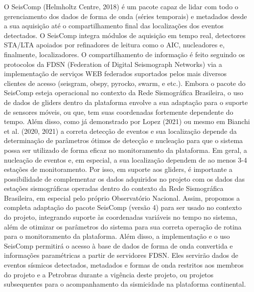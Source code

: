 \documentclass[10pt,a4paper,oneside]{book}
\begin{document}
O SeisComp (Helmholtz Centre, 2018) é um pacote capaz de lidar com todo o gerenciamento dos dados de forma de onda (séries temporais) e metadados desde a sua aquisição até o compartilhamento final das localizações dos eventos detectados. O SeisComp integra módulos de aquisição em tempo real, detectores STA/LTA apoiados por refinadores de leitura como o AIC, nucleadores e, finalmente, localizadores. O compartilhamento de informação é feito seguindo os protocolos da FDSN (Federation of Digital Seismograph Networks) via a implementação de serviços WEB federados suportados pelos mais diversos clientes de acesso (seisgram, obspy, pyrocko, swarm, e etc.). Embora o pacote do SeisComp esteja operacional no contexto da Rede Sismográfica Brasileira, o uso de dados de gliders dentro da
plataforma envolve a sua adaptação para o suporte de sensores móveis, ou que, tem suas coordenadas fortemente dependente do tempo. Além disso, como já demonstrado por Lopez (2021) ou mesmo em Bianchi et al. (2020, 2021) a correta detecção de eventos e sua localização depende da determinação de parâmetros ótimos de detecção e nucleação para que o sistema possa ser utilizado de forma eficaz no monitoramento da plataforma. Em geral, a nucleação de eventos e, em especial, a sua localização dependem de ao menos 3-4 estações de monitoramento. Por isso, em suporte aos gliders, é importante a possibilidade de complementar os dados adquiridos no projeto com os dados das estações sismográficas operadas dentro do contexto da Rede Sismográfica Brasileira, em especial pelo próprio Observatório Nacional. Assim, propomos a completa adaptação do pacote SeisComp (versão 4) para ser usado no contexto do projeto,
integrando suporte às coordenadas variáveis no tempo no sistema, além de otimizar os parâmetros do sistema para sua correta operação de rotina para o monitoramento da plataforma. Além disso, a implementação e o uso SeisComp permitirá o acesso à base de dados de forma de onda convertida e informações paramétricas a partir de servidores FDSN. Eles servirão dados de eventos sísmicos detectados, metadados e formas de onda restritos aos membros do projeto e a Petrobras durante a vigência deste projeto, ou projetos subsequentes para o acompanhamento da sismicidade na plataforma continental.

\bigskip
\end{document}
